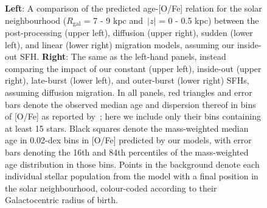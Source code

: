 \documentclass[draft2.tex]{subfiles}
\begin{document}
\begin{figure}
\caption{
\textbf{Left}: A comparison of the predicted age-[O/Fe] relation for the solar 
neighbourhood ($R_\text{gal}$ = 7 - 9 kpc and~$\left|z\right|$ = 0 - 0.5 kpc) 
between the post-processing (upper left), diffusion (upper right), sudden 
(lower left), and linear (lower right) migration models, assuming our 
inside-out SFH. 
\textbf{Right}: The same as the left-hand panels, instead comparing the impact 
of our constant (upper left), inside-out (upper right), late-burst (lower left), 
and outer-burst (lower right) SFHs, assuming diffusion migration. In all panels, 
red triangles and error bars denote the observed median age and dispersion 
thereof in bins of [O/Fe] as reported by~\citet{Feuillet2019}; here we include 
only their bins containing at least 15 stars. Black squares denote the 
mass-weighted median age in 0.02-dex bins in [O/Fe] predicted by our models, 
with error bars denoting the 16th and 84th percentiles of the mass-weighted 
age distribution in those bins. Points in the background denote each individual 
stellar population from the model with a final position in the solar 
neighbourhood, colour-coded according to their Galactocentric radius of birth. 
}
\label{fig:age_alpha} 
\end{figure} 
\end{document}
